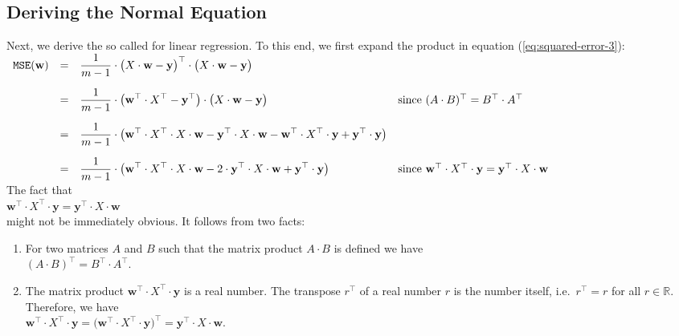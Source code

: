 \subsection{Deriving the Normal Equation}
Next, we derive the so called  for linear regression.  To this end, we first
expand the product in equation (\ref{eq:squared-error-3}):
\\[0.2cm]
\hspace*{0.3cm}
$
\begin{array}[t]{lcll}
 \mathtt{MSE}(\mathbf{w}) & = & 
 \displaystyle \frac{1}{m-1} \cdot \bigl(X \cdot \mathbf{w} - \textbf{y}\bigr)^\top \cdot \bigl(X \cdot \mathbf{w} - \textbf{y}\bigr) 
 \\[0.5cm]
 & = & 
 \displaystyle \frac{1}{m-1} \cdot \bigl(\mathbf{w}^\top \cdot X^\top - \textbf{y}^\top\bigr) \cdot \bigl(X \cdot \mathbf{w} - \textbf{y}\bigr) 
 & \mbox{since $(A \cdot B)^\top = B^\top \cdot A^\top$}
 \\[0.5cm]
 & = & 
 \displaystyle \frac{1}{m-1} \cdot \bigl(\mathbf{w}^\top \cdot X^\top \cdot X \cdot \mathbf{w} 
                             - \textbf{y}^\top \cdot X \cdot \mathbf{w} 
                             - \mathbf{w}^\top \cdot X^\top \cdot \mathbf{y}
                             + \mathbf{y}^\top \cdot \mathbf{y}
                       \bigr)
 \\[0.5cm]
 & = & 
 \displaystyle \frac{1}{m-1} \cdot \bigl(\mathbf{w}^\top \cdot X^\top \cdot X \cdot \mathbf{w} 
                             - 2 \cdot \textbf{y}^\top \cdot X \cdot \mathbf{w} 
                             + \mathbf{y}^\top \cdot \mathbf{y}
                       \bigr)
 & \mbox{since $\mathbf{w}^\top \cdot X^\top \cdot \mathbf{y} = \textbf{y}^\top \cdot X \cdot \mathbf{w}$}
\end{array}
$
\\[0.2cm]
The fact that 
\\[0.2cm]
\hspace*{1.3cm}
$\mathbf{w}^\top \cdot X^\top \cdot \mathbf{y} = \textbf{y}^\top \cdot X \cdot \mathbf{w}$
\\[0.2cm]
might not be immediately obvious.  It follows from two facts:
\begin{enumerate}
\item For two matrices $A$ and $B$ such that the matrix product $A \cdot B$ is defined we have 
      \\[0.2cm]
      \hspace*{1.3cm}
      $(A \cdot B)^\top = B^\top \cdot A^\top$.
\item The matrix product $\mathbf{w}^\top \cdot X^\top \cdot \mathbf{y}$ is a real number.  The transpose $r^\top$ of a real number $r$ is the number
      itself, i.e.~$r^\top = r$ for all $r \in \mathbb{R}$.  Therefore, we have
      \\[0.2cm]
      \hspace*{1.3cm}
      $\mathbf{w}^\top \cdot X^\top \cdot \mathbf{y} = 
\bigl(\mathbf{w}^\top \cdot X^\top \cdot \mathbf{y}\bigr)^\top =
\mathbf{y}^\top \cdot X \cdot \mathbf{w}
$.
\end{enumerate}

